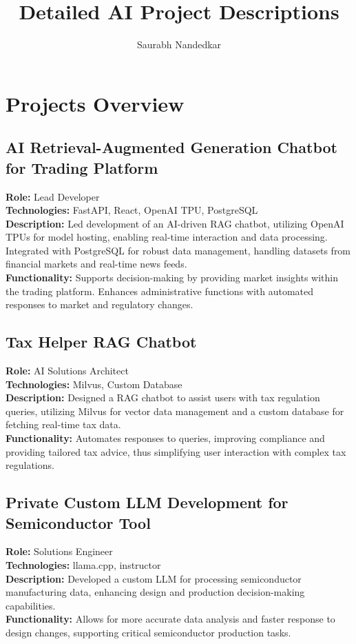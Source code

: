 \documentclass[11pt]{article}
\title{Detailed AI Project Descriptions}
\author{Saurabh Nandedkar}
\date{}
\begin{document}
\maketitle

\section*{Projects Overview}

\subsection*{AI Retrieval-Augmented Generation Chatbot for Trading Platform}
\textbf{Role:} Lead Developer \\
\textbf{Technologies:} FastAPI, React, OpenAI TPU, PostgreSQL \\
\textbf{Description:} Led development of an AI-driven RAG chatbot, utilizing OpenAI TPUs for model hosting, enabling real-time interaction and data processing. Integrated with PostgreSQL for robust data management, handling datasets from financial markets and real-time news feeds. \\
\textbf{Functionality:} Supports decision-making by providing market insights within the trading platform. Enhances administrative functions with automated responses to market and regulatory changes.

\subsection*{Tax Helper RAG Chatbot}
\textbf{Role:} AI Solutions Architect \\
\textbf{Technologies:} Milvus, Custom Database \\
\textbf{Description:} Designed a RAG chatbot to assist users with tax regulation queries, utilizing Milvus for vector data management and a custom database for fetching real-time tax data. \\
\textbf{Functionality:} Automates responses to queries, improving compliance and providing tailored tax advice, thus simplifying user interaction with complex tax regulations.

\subsection*{Private Custom LLM Development for Semiconductor Tool}
\textbf{Role:} Solutions Engineer \\
\textbf{Technologies:} llama.cpp, instructor \\
\textbf{Description:} Developed a custom LLM for processing semiconductor manufacturing data, enhancing design and production decision-making capabilities. \\
\textbf{Functionality:} Allows for more accurate data analysis and faster response to design changes, supporting critical semiconductor production tasks.
\end{document}
